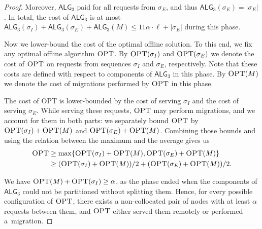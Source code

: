\documentclass[a4paper,anonymous,USenglish]{lipics-v2019}
\newcommand{\OPT}{\textsc{OPT}\xspace}
\newcommand{\TAlg}{{\ensuremath{\textsf{ALG}_{3}}}\xspace}
\newcommand\maciek[1]{\color{brown}\textbf{(Maciek: #1)}\color{black}}
\begin{document}
\begin{proof}
	
	Moreover, \TAlg paid for all requests from $\sigma_E$, and thus $\TAlg(\sigma_E) = |\sigma_E|$.
	In total, the cost of \TAlg is at most $\TAlg(\sigma_I) + \TAlg(\sigma_E) + \TAlg(M) \leq 11\alpha\cdot \ell + |\sigma_E|$ during this phase.
	
	\medskip
	
	Now we lower-bound the cost of the optimal offline solution.
	To this end, we fix any optimal offline algorithm $\OPT$.
	By $\OPT(\sigma_I)$ and $\OPT(\sigma_E)$ we denote the cost of $\OPT$ on requests from sequences $\sigma_I$ and $\sigma_E$, respectively.
	Note that these costs are defined with respect to components of \TAlg in this phase.
	By $\OPT(M)$ we denote the cost of migrations performed by $\OPT$ in this phase.
	
	The cost of \OPT is lower-bounded by the cost of serving $\sigma_I$ and the cost of serving $\sigma_E$.
	While serving these requests, $\OPT$ may perform migrations, and we account for them in both parts: we separately bound $\OPT$ by $\OPT(\sigma_I) + \OPT(M)$ and $\OPT(\sigma_E) + \OPT(M)$.
	Combining those bounds and using the relation between the maximum and the average gives us
	\begin{align*}
		\OPT&\geq \max\{\OPT(\sigma_I) + \OPT(M), \OPT(\sigma_E) + \OPT(M)\}\\
		&\geq (\OPT(\sigma_I) + \OPT(M)) / 2 + (\OPT(\sigma_E) + \OPT(M)) / 2.
	\end{align*}
	
	
	We have $\OPT(M) + \OPT(\sigma_I) \geq \alpha$, as the phase ended when the components of \TAlg{} could not be partitioned without splitting them.
	Hence, for every possible configuration of $\OPT$, there exists a non-collocated pair of nodes with at least $\alpha$ requests between them, and
	$\OPT$ either served them remotely or performed a~migration.
	

\end{proof}
\end{document}
